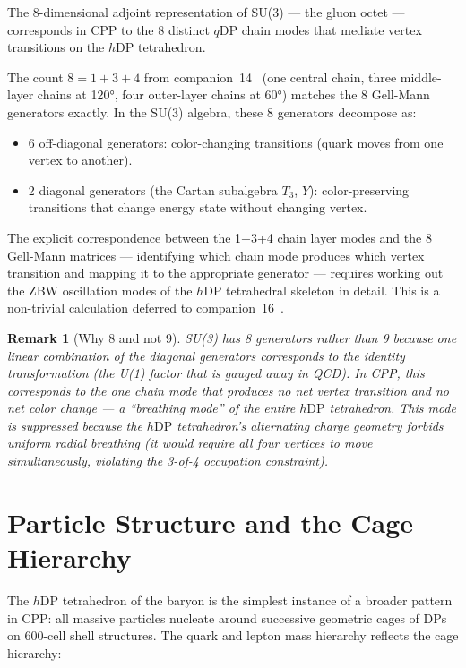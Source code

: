 \documentclass[12pt]{article}
\newtheorem{remark}[theorem]{Remark}
\newcommand{\qDP}{q\mathrm{DP}}
\newcommand{\hDP}{h\mathrm{DP}}
\begin{document}
The 8-dimensional adjoint representation of SU(3) --- the gluon octet
--- corresponds in CPP to the 8 distinct $\qDP$ chain modes that mediate
vertex transitions on the $\hDP$ tetrahedron.

The count $8 = 1 + 3 + 4$ from companion~14~\cite{c14} (one central
chain, three middle-layer chains at 120°, four outer-layer chains at 60°)
matches the 8 Gell-Mann generators exactly.  In the SU(3) algebra,
these 8 generators decompose as:
\begin{itemize}[noitemsep]
\item 6 off-diagonal generators: color-changing transitions
  (quark moves from one vertex to another).
\item 2 diagonal generators (the Cartan subalgebra $T_3$, $Y$):
  color-preserving transitions that change energy state without
  changing vertex.
\end{itemize}

The explicit correspondence between the 1+3+4 chain layer modes and
the 8 Gell-Mann matrices --- identifying which chain mode produces
which vertex transition and mapping it to the appropriate generator
--- requires working out the ZBW oscillation modes of the $\hDP$
tetrahedral skeleton in detail.  This is a non-trivial calculation
deferred to companion~16~\cite{c16}.

\begin{remark}[Why 8 and not 9]
SU(3) has 8 generators rather than 9 because one linear combination
of the diagonal generators corresponds to the identity transformation
(the U(1) factor that is gauged away in QCD).  In CPP, this
corresponds to the one chain mode that produces no net vertex
transition and no net color change --- a ``breathing mode'' of the
entire $\hDP$ tetrahedron.  This mode is suppressed because the
$\hDP$ tetrahedron's alternating charge geometry forbids uniform
radial breathing (it would require all four vertices to move
simultaneously, violating the 3-of-4 occupation constraint).
\end{remark}

\section{Particle Structure and the Cage Hierarchy}
\label{sec:cages}

The $\hDP$ tetrahedron of the baryon is the simplest instance of a
broader pattern in CPP: all massive particles nucleate around
successive geometric cages of DPs on 600-cell shell structures.
The quark and lepton mass hierarchy reflects the cage hierarchy:
\end{document}

